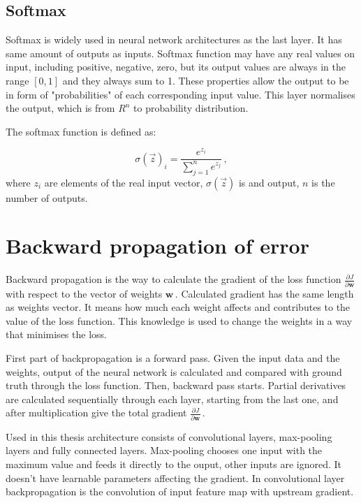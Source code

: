 \subsection{Softmax}

Softmax is widely used in neural network architectures as the last layer. It has same amount of outputs as inputs. Softmax function may have any real values on input, including positive, negative, zero, but its output values are always in the range $[0, 1]$ and they always sum to 1. These properties allow the output to be in form of "probabilities" of each corresponding input value. This layer normalises the output, which is from $R^n$ to probability distribution.

The softmax function is defined as:

\begin{equation}
	\sigma(\vec z)_i = \frac{e^{z_i}}{\sum\limits_{j=1}^n e^{z_j}}\,,
\end{equation}
where $z_i$ are elements of the real input vector, $\sigma(\vec z)$ is and output, $n$ is the number of outputs.


\section{Backward propagation of error}
\label{backprop}

Backward propagation is the way to calculate the gradient of the loss function $\frac{\partial J}{\partial \textbf{w}}$ with respect to the vector of weights $\textbf{w}$\,. Calculated gradient has the same length as weights vector. It means how much each weight affects and contributes to the value of the loss function. This knowledge is used to change the weights in a way that minimises the loss. 

First part of backpropagation is a forward pass. Given the input data and the weights, output of the neural network is calculated and compared with ground truth through the loss function. Then, backward pass starts. Partial derivatives are calculated sequentially through each layer, starting from the last one, and after multiplication give the total gradient $\frac{\partial J}{\partial \textbf{w}}$\,.

Used in this thesis architecture consists of convolutional layers, max-pooling layers and fully connected layers. Max-pooling chooses one input with the maximum value and feeds it directly to the ouput, other inputs are ignored. It doesn't have learnable parameters affecting the gradient. In convolutional layer backpropagation is the convolution of input feature map with upstream gradient. 












